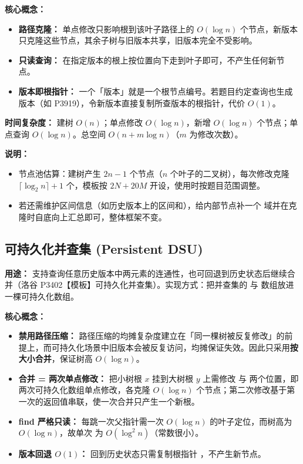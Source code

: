 \textbf{核心概念：}
\begin{itemize}
  \item \textbf{路径克隆：} 单点修改只影响根到该叶子路径上的 $O(\log n)$ 个节点，新版本只克隆这些节点，其余子树与旧版本共享，旧版本完全不受影响。
  \item \textbf{只读查询：} 在指定版本的根上按位置向下走到叶子即可，不产生任何新节点。
  \item \textbf{版本即根指针：} 一个「版本」就是一个根节点编号。若题目约定查询也生成版本（如 P3919），令新版本直接复制所查版本的根指针，代价 $O(1)$。
\end{itemize}

\textbf{时间复杂度：} 建树 $O(n)$；单点修改 $O(\log n)$，新增 $O(\log n)$ 个节点；单点查询 $O(\log n)$。总空间 $O(n + m\log n)$（$m$ 为修改次数）。



\textbf{说明：}
\begin{itemize}
  \item 节点池估算：建树产生 $2n - 1$ 个节点（$n$ 个叶子的二叉树），每次修改克隆 $\lceil \log_2 n \rceil + 1$ 个，模板按 $2N + 20M$ 开设，使用时按题目范围调整。
  \item 若还需维护区间信息（如历史版本上的区间和），给内部节点补一个  域并在克隆时自底向上汇总即可，整体框架不变。
\end{itemize}

\subsection{可持久化并查集 (Persistent DSU)}

\textbf{用途：}
支持查询任意历史版本中两元素的连通性，也可回退到历史状态后继续合并（洛谷 P3402【模板】可持久化并查集）。实现方式：把并查集的  与  数组放进一棵可持久化数组。

\textbf{核心概念：}
\begin{itemize}
  \item \textbf{禁用路径压缩：} 路径压缩的均摊复杂度建立在「同一棵树被反复修改」的前提上，而可持久化场景中旧版本会被反复访问，均摊保证失效。因此只采用\textbf{按大小合并}，保证树高 $O(\log n)$。
  \item \textbf{合并 = 两次单点修改：} 把小树根 $x$ 挂到大树根 $y$ 上需修改  与  两个位置，即两次可持久化数组单点修改，各克隆 $O(\log n)$ 个节点；第二次修改基于第一次的返回值串联，使一次合并只产生一个新根。
  \item \textbf{find 严格只读：} 每跳一次父指针需一次 $O(\log n)$ 的叶子定位，而树高为 $O(\log n)$，故单次  为 $O(\log^2 n)$（常数很小）。
  \item \textbf{版本回退 $O(1)$：} 回到历史状态只需复制根指针 ，不产生新节点。
\end{itemize}

